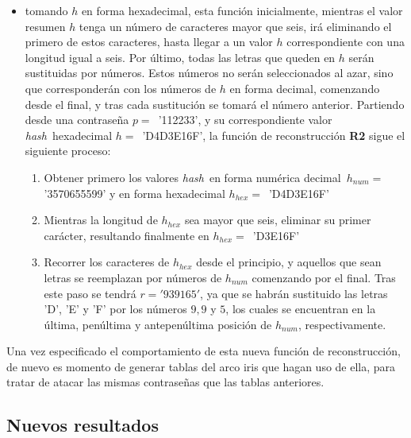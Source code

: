 \documentclass[12pt,spanish,listoffigures,listoftables,listofalgorithms]{tfgetsinf}
\newcommand{\hash}{\textit{hash}}
\begin{document}
\begin{itemize}

	\item tomando $h$ en forma hexadecimal, esta función inicialmente, mientras el valor resumen $h$ tenga un número de caracteres mayor que seis, irá eliminando el primero de estos caracteres, hasta llegar a un valor $h$ correspondiente con una longitud igual a seis. Por último, todas las letras que queden en $h$ serán sustituidas por números. Estos números no serán seleccionados al azar, sino que corresponderán con los números de $h$ en forma decimal, comenzando desde el final, y tras cada sustitución se tomará el número anterior. Partiendo desde una contraseña $p =$~'112233', y su correspondiente valor \hash~hexadecimal $h =$~'D4D3E16F', la función de reconstrucción \textbf{R2} sigue el siguiente proceso:

		\begin{enumerate}
				
			\item Obtener primero los valores \hash~en forma numérica decimal~$h_{num} =$\\
			'3570655599' y en forma hexadecimal $h_{hex} =$~'D4D3E16F'

			\item Mientras la longitud de $h_{hex}$ sea mayor que seis, eliminar su primer carácter, resultando finalmente en $h_{hex} =$~'D3E16F'
		
			\item Recorrer los caracteres de $h_{hex}$ desde el principio, y aquellos que sean letras se reemplazan por números de $h_{num}$ comenzando por el final. Tras este paso se tendrá $r = '939165'$, ya que se habrán sustituido las letras 'D', 'E' y 'F' por los números $9, 9$ y $5$, los cuales se encuentran en la última, penúltima y antepenúltima posición de $h_{num}$, respectivamente.

		\end{enumerate}

\end{itemize}

Una vez especificado el comportamiento de esta nueva función de reconstrucción, de nuevo es momento de generar tablas del arco iris que hagan uso de ella, para tratar de atacar las mismas contraseñas que las tablas anteriores.

\subsection{Nuevos resultados}
\end{document}
